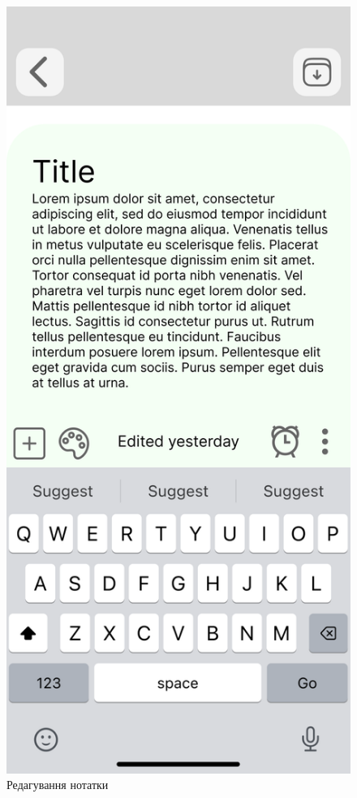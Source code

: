 \documentclass[oneside,14pt]{extarticle}
\begin{document}
\begin{normalsize}
	\begin{figure}[H]
		\begin{minipage}{0.48\textwidth}
			\centering
			\includegraphics[scale=0.13]{Frame 7}
			\caption{Редагування нотатки}

\end{minipage}
\end{figure}
\end{normalsize}
\end{document}
